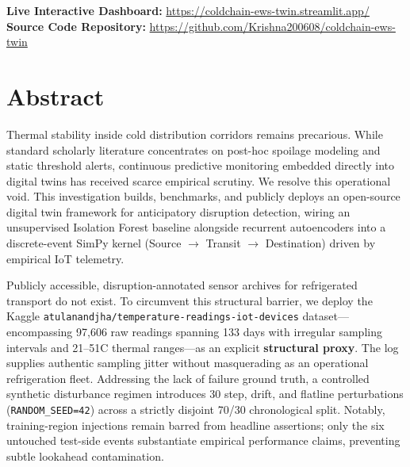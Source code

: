 \documentclass[11pt,a4paper,oneside]{report}
\begin{document}
\begin{titlepage}
\begin{center}
        \vspace{1.0cm}

        \begin{tcolorbox}[
            enhanced, colback=LightBlueBg, colframe=IceTeal, arc=3pt, boxrule=1pt,
            width=0.9\textwidth, boxsep=6pt, left=10pt, right=10pt, top=6pt, bottom=6pt
        ]
        \centering
        \sffamily\small
        \textbf{Live Interactive Dashboard:} \url{https://coldchain-ews-twin.streamlit.app/}\\[3pt]
        \textbf{Source Code Repository:} \url{https://github.com/Krishna200608/coldchain-ews-twin}
        \end{tcolorbox}

    \end{center}
\end{titlepage}
\hypersetup{pageanchor=true}


\chapter*{Abstract}

Thermal stability inside cold distribution corridors remains precarious. While standard scholarly literature concentrates on post-hoc spoilage modeling and static threshold alerts, continuous predictive monitoring embedded directly into digital twins has received scarce empirical scrutiny. We resolve this operational void. This investigation builds, benchmarks, and publicly deploys an open-source digital twin framework for anticipatory disruption detection, wiring an unsupervised Isolation Forest baseline alongside recurrent autoencoders into a discrete-event SimPy kernel (Source $\rightarrow$ Transit $\rightarrow$ Destination) driven by empirical IoT telemetry.

Publicly accessible, disruption-annotated sensor archives for refrigerated transport do not exist. To circumvent this structural barrier, we deploy the Kaggle \texttt{atulanandjha/temperature-readings-iot-devices} dataset---encompassing 97,606 raw readings spanning 133 days with irregular sampling intervals and 21--51\textdegree{}C thermal ranges---as an explicit \textbf{structural proxy}. The log supplies authentic sampling jitter without masquerading as an operational refrigeration fleet. Addressing the lack of failure ground truth, a controlled synthetic disturbance regimen introduces 30 step, drift, and flatline perturbations (\texttt{RANDOM\_SEED=42}) across a strictly disjoint 70/30 chronological split. Notably, training-region injections remain barred from headline assertions; only the six untouched test-side events substantiate empirical performance claims, preventing subtle lookahead contamination.
\end{document}
